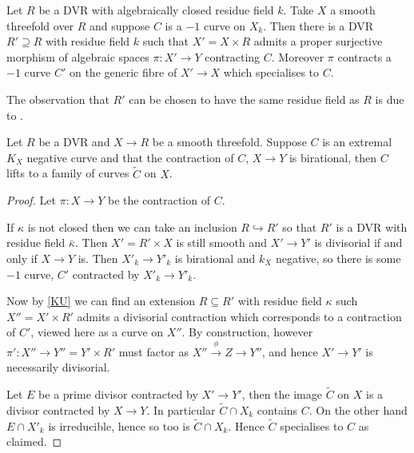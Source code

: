 	\begin{lemma}\cite[Lemma 9.4]{katsura1985elliptic} \label{KU}
		Let $R$ be a DVR with algebraically closed residue field $k$. Take $X$ a smooth threefold over $R$ and suppose $C$ is a $-1$ curve on $X_{k}$. Then there is a DVR $R' \supseteq R$ with residue field $k$ such that $X'=X\times R$ admits a proper surjective morphism of algebraic spaces $\pi:X' \to Y$  contracting $C$. Moreover $\pi$ contracts a $-1$ curve $C'$ on the generic fibre of $X' \to X$ which specialises to $C$.
	\end{lemma}
	
	The observation that $R'$ can be chosen to have the same residue field as $R$ is due to \cite[Lemma 3.6]{egbert2016log}.
	
	\begin{theorem}\label{curves}
		Let $R$ be a DVR and $X \to R$ be a smooth threefold. Suppose $C$ is an extremal $K_{X}$ negative curve and that the contraction of $C$, $X\to Y$ is birational, then $C$ lifts to a family of curves $\tilde{C}$ on $X$. 
	\end{theorem}
	
	\begin{proof}
		
		Let $\pi:X \to Y$ be the contraction of $C$. 
		
		If $\kappa$ is not closed then we can take an inclusion $R \hookrightarrow R'$ so that $R'$ is a DVR with residue field $\bar{\kappa}$. Then $X'=R'\times X$ is still smooth and $X' \to Y'$ is divisorial if and only if $X \to Y$ is. Then $X'_{k} \to Y'_{k}$ is birational and $k_{X}$ negative, so there is some $-1$ curve, $C'$ contracted by $X'_{k} \to Y'_{k}$. 
		
		Now by \autoref{KU} we can find an extension $R \subseteq R'$ with residue field $\kappa$ such $X''=X'\times R'$ admits a divisorial contraction which corresponds to a contraction of $C'$, viewed here as a curve on $X''$. By construction, however $\pi':X'' \to Y''=Y'\times R'$ must factor as $X''\xrightarrow{\phi} Z \to Y''$, and hence $X' \to Y'$ is necessarily divisorial.
		
		Let $E$ be a prime divisor contracted by $X' \to Y'$, then the image $\tilde{C}$ on $X$ is a divisor contracted by $X \to Y$. In particular $\tilde{C} \cap X_{k}$ contains $C$. On the other hand $E\cap X'_{k}$ is irreducible, hence so too is $\tilde{C} \cap X_{k}$. Hence $\tilde{C}$ specialises to $C$ as claimed.

	\end{proof}

